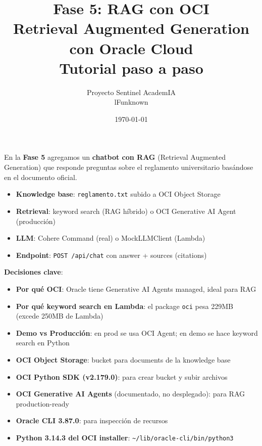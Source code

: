 \documentclass[11pt,a4paper,oneside]{article}
\title{\Huge\textbf{Fase 5: RAG con OCI} \\[0.3em]
       \Large Retrieval Augmented Generation con Oracle Cloud \\[0.5em]
       \normalsize Tutorial paso a paso}
\author{Proyecto Sentinel AcademIA \\ \small lFunknown}
\date{\today}
\begin{document}
\maketitle
\thispagestyle{empty}

\begin{tcolorbox}[colback=blue!5!white,colframe=infoblue,title={\textbf{¿Qué construimos en este tutorial?}}]
En la \textbf{Fase 5} agregamos un \textbf{chatbot con RAG} (Retrieval Augmented Generation) que responde preguntas sobre el reglamento universitario bas\'andose en el documento oficial.

\begin{itemize}
  \item \textbf{Knowledge base}: \texttt{reglamento.txt} subido a OCI Object Storage
  \item \textbf{Retrieval}: keyword search (RAG h\'ibrido) o OCI Generative AI Agent (producci\'on)
  \item \textbf{LLM}: Cohere Command (real) o MockLLMClient (Lambda)
  \item \textbf{Endpoint}: \texttt{POST /api/chat} con answer + sources (citations)
\end{itemize}

\textbf{Decisiones clave}:
\begin{itemize}
  \item \textbf{Por qu\'e OCI}: Oracle tiene Generative AI Agents managed, ideal para RAG
  \item \textbf{Por qu\'e keyword search en Lambda}: el package \texttt{oci} pesa 229MB (excede 250MB de Lambda)
  \item \textbf{Demo vs Producci\'on}: en prod se usa OCI Agent; en demo se hace keyword search en Python
\end{itemize}
\end{tcolorbox}

\begin{tcolorbox}[colback=warnorange!5!white,colframe=warnorange,title={\textbf{Herramientas de Oracle usadas}}]
\begin{itemize}
  \item \textbf{OCI Object Storage}: bucket para documents de la knowledge base
  \item \textbf{OCI Python SDK (v2.179.0)}: para crear bucket y subir archivos
  \item \textbf{OCI Generative AI Agents} (documentado, no desplegado): para RAG production-ready
  \item \textbf{Oracle CLI 3.87.0}: para inspecci\'on de recursos
  \item \textbf{Python 3.14.3 del OCI installer}: \texttt{\textasciitilde/lib/oracle-cli/bin/python3}
\end{itemize}
\end{tcolorbox}
\end{document}
